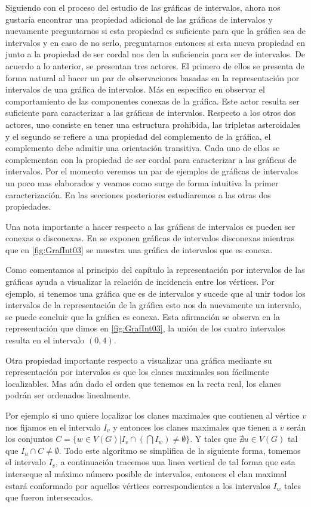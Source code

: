 Siguiendo con el proceso del estudio de las gráficas de intervalos, ahora nos gustaría encontrar una propiedad adicional de las gráficas de intervalos y nuevamente preguntarnos si esta propiedad es suficiente para que la gráfica sea de intervalos y en caso de no serlo, preguntarnos entonces si esta nueva propiedad en junto a la propiedad de ser cordal nos den la suficiencia para ser de intervalos.
De acuerdo a lo anterior, se presentan tres actores. El primero de ellos se presenta de forma natural al hacer un par de observaciones basadas en la representación por intervalos de una gráfica de intervalos. Más en especifico en observar el comportamiento de las componentes conexas de la gráfica. Este actor resulta ser suficiente para caracterizar a las gráficas de intervalos. Respecto a los otros dos actores, uno consiste en tener una estructura prohibida, las tripletas asteroidales y el segundo se refiere a una propiedad del complemento de la gráfica, el complemento debe admitir una orientación transitiva. Cada uno de ellos se complementan con la propiedad de ser cordal para caracterizar a las gráficas de intervalos. 
Por el momento veremos un par de ejemplos de gráficas de intervalos un poco mas elaborados y veamos como surge de forma intuitiva la primer caracterización. En las secciones posteriores estudiaremos a las otras dos propiedades.

Una nota importante a hacer respecto a las gráficas de intervalos es pueden ser conexas o disconexas. En  se exponen gráficas de intervalos disconexas mientras que en \cref{fig:GrafInt03} se muestra una gráfica de intervalos que es conexa. 

Como comentamos al principio del capítulo la representación por intervalos de las gráficas ayuda a visualizar la relación de incidencia entre los vértices. Por ejemplo, si tenemos una gráfica que es de intervalos y sucede que al unir todos los intervalos de la representación de la gráfica esto nos da nuevamente un intervalo, se puede concluir que la gráfica es conexa.
Esta afirmación se observa en la representación que dimos en \cref{fig:GrafInt03}, la unión de los cuatro intervalos resulta en el intervalo $(0,4)$.

Otra propiedad importante respecto a visualizar una gráfica mediante su representación por intervalos es que los clanes maximales son fácilmente localizables. Mas aún dado el orden que tenemos en la recta real, los clanes podrán ser ordenados linealmente.

Por ejemplo si uno quiere localizar los clanes maximales que contienen al vértice $v$ nos fijamos en el intervalo $I_v$ y entonces los clanes maximales que tienen a $v$ serán los conjuntos $C = \{w \in V(G)| I_v \cap (\bigcap I_w) \neq \emptyset\}$.
Y tales que $\nexists u \in V(G)$ tal que $I_u \cap C \neq \emptyset$.
Todo este algoritmo se simplifica de la siguiente forma, tomemos el intervalo $I_v$, a continuación tracemos una linea vertical de tal forma que esta interseque al máximo número posible de intervalos, entonces el clan maximal estará conformado por aquellos vértices correspondientes a los intervalos $I_w$ tales que fueron intersecados.  

